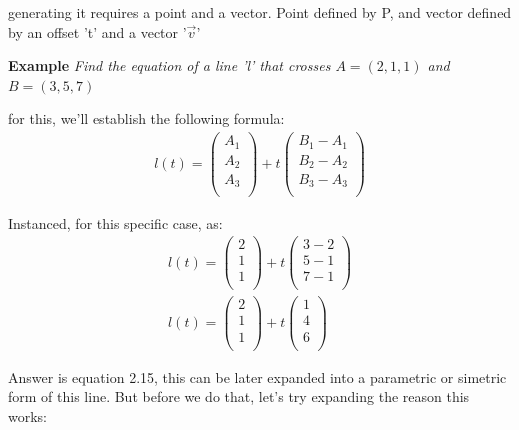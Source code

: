 \documentclass[11pt,fleqn]{book} %
\begin{document}
generating it requires a point and a vector. Point defined by P, and vector defined by an offset 't' and a vector '$\vec{v}$'

\textbf{Example}
\textit{Find the equation of a line 'l' that crosses $A=(2,1,1)$ and $B=(3,5,7)$}

for this, we'll establish the following formula:
\begin{gather}
    l(t) =
    \begin{pmatrix}
        A_1\\
        A_2\\
        A_3\\
    \end{pmatrix}
    +
    t 
    \begin{pmatrix}
        B_1-A_1\\
        B_2-A_2\\
        B_3-A_3\\
    \end{pmatrix}
\end{gather}

Instanced, for this specific case, as:
\begin{gather}
    l(t) =
    \begin{pmatrix}
        2\\
        1\\
        1\\
    \end{pmatrix}
    +
    t 
    \begin{pmatrix}
        3-2\\
        5-1\\
        7-1\\
    \end{pmatrix}
    \\
    l(t) =
    \begin{pmatrix}
        2\\
        1\\
        1\\
    \end{pmatrix}
    +
    t 
    \begin{pmatrix}
        1\\
        4\\
        6\\
    \end{pmatrix}
\end{gather}

Answer is equation 2.15, this can be later expanded into a parametric or simetric form of this line. But before we do that, let's try expanding the reason this works:
\end{document}
